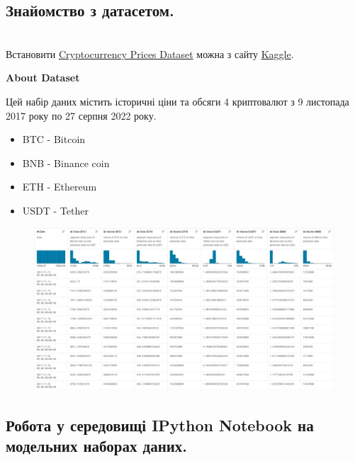 \documentclass[a4paper,12pt]{article}
\begin{document}
    \subsection {Знайомство з датасетом.}
    \hrulefill \\
    Встановити \href{https://www.kaggle.com/datasets/thedevastator/get-your-game-on-metacritic-recommendations-and}{Cryptocurrency Prices Dataset} можна з сайту 
    \href{https://www.kaggle.com/}{Kaggle}.
    \begin{center}
        \textbf{About Dataset}
    \end{center}
    Цей набір даних містить історичні ціни та обсяги 4 криптовалют з 9 листопада 2017 року по 27 серпня 2022 року.
    \begin{itemize}
        \item BTC - Bitcoin
        \item BNB - Binance coin
        \item ETH - Ethereum
        \item USDT - Tether
    \end{itemize}
    \begin{figure}[h!]
        \begin{center}
            \includegraphics[scale=0.5]{Prt sc/Figure_14.jpg}
        \end{center}
    \end{figure}

    \subsection {Робота у середовищі IPython Notebook на модельних наборах даних.}
    \hrulefill \\
    
\end{document}
